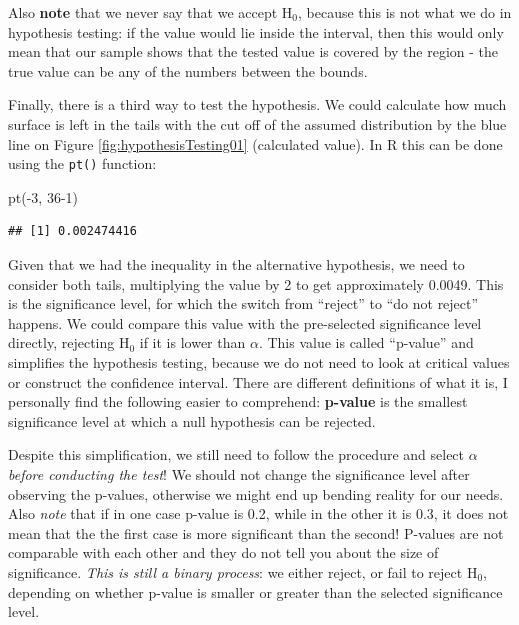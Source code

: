 \documentclass[
]{book}
\newenvironment{Shaded}{\begin{snugshade}}{\end{snugshade}}
\newcommand{\DecValTok}[1]{\textcolor[rgb]{0.00,0.00,0.81}{#1}}
\newcommand{\FunctionTok}[1]{\textcolor[rgb]{0.00,0.00,0.00}{#1}}
\newcommand{\NormalTok}[1]{#1}
\newcommand{\SpecialCharTok}[1]{\textcolor[rgb]{0.00,0.00,0.00}{#1}}
\theoremstyle{definition}
\theoremstyle{definition}
\theoremstyle{definition}
\theoremstyle{definition}
\theoremstyle{remark}
\begin{document}
Also \textbf{note} that we never say that we accept \(\mathrm{H}_0\), because this is not what we do in hypothesis testing: if the value would lie inside the interval, then this would only mean that our sample shows that the tested value is covered by the region - the true value can be any of the numbers between the bounds.

Finally, there is a third way to test the hypothesis. We could calculate how much surface is left in the tails with the cut off of the assumed distribution by the blue line on Figure \ref{fig:hypothesisTesting01} (calculated value). In R this can be done using the \texttt{pt()} function:

\begin{Shaded}
\begin{Highlighting}[]
\FunctionTok{pt}\NormalTok{(}\SpecialCharTok{{-}}\DecValTok{3}\NormalTok{, }\DecValTok{36{-}1}\NormalTok{)}
\end{Highlighting}
\end{Shaded}

\begin{verbatim}
## [1] 0.002474416
\end{verbatim}

Given that we had the inequality in the alternative hypothesis, we need to consider both tails, multiplying the value by 2 to get approximately 0.0049. This is the significance level, for which the switch from ``reject'' to ``do not reject'' happens. We could compare this value with the pre-selected significance level directly, rejecting \(\mathrm{H}_0\) if it is lower than \(\alpha\). This value is called ``p-value'' and simplifies the hypothesis testing, because we do not need to look at critical values or construct the confidence interval. There are different definitions of what it is, I personally find the following easier to comprehend: \textbf{p-value} is the smallest significance level at which a null hypothesis can be rejected.

Despite this simplification, we still need to follow the procedure and select \(\alpha\) \emph{before conducting the test}! We should not change the significance level after observing the p-values, otherwise we might end up bending reality for our needs. Also \emph{note} that if in one case p-value is 0.2, while in the other it is 0.3, it does not mean that the the first case is more significant than the second! P-values are not comparable with each other and they do not tell you about the size of significance. \emph{This is still a binary process}: we either reject, or fail to reject \(\mathrm{H}_0\), depending on whether p-value is smaller or greater than the selected significance level.
\end{document}
